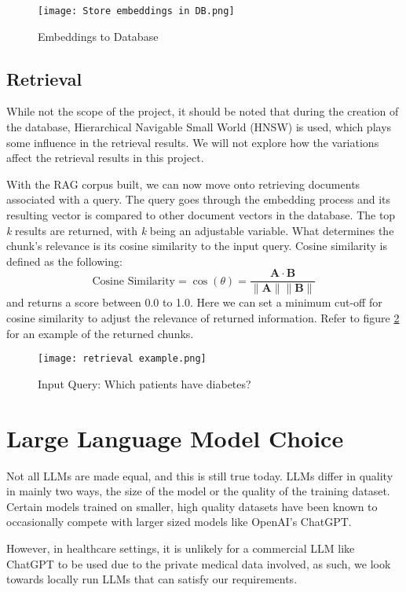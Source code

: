 \begin{figure}
	\texttt{[image: Store embeddings in DB.png]}
	\caption{Embeddings to Database}
	\centering
	\label{fig:EmbeddingsDatabase}
\end{figure}

\subsection{Retrieval}
While not the scope of the project, it should be noted that during the creation of the database, Hierarchical Navigable Small World (HNSW) is used, which plays some influence in the retrieval results. We will not explore how the variations affect the retrieval results in this project.

With the RAG corpus built, we can now move onto retrieving documents associated with a query.
The query goes through the embedding process and its resulting vector is compared to other document vectors in the database.
The top \textit{k} results are returned, with \textit{k} being an adjustable variable.
What determines the chunk's relevance is its cosine similarity to the input query.
Cosine similarity is defined as the following:
\[
	\text{Cosine Similarity} = \cos(\theta) = \frac{\mathbf{A} \cdot \mathbf{B}}{\|\mathbf{A}\| \|\mathbf{B}\|}
\]
and returns a score between 0.0 to 1.0.
Here we can set a minimum cut-off for cosine similarity to adjust the relevance of returned information.
Refer to figure \ref{fig:RetrievalExample} for an example of the returned chunks.

\begin{figure}
	\centering
	\texttt{[image: retrieval example.png]}
	\caption{Input Query: Which patients have diabetes?}
	\label{fig:RetrievalExample}
\end{figure}

\section{Large Language Model Choice}

Not all LLMs are made equal, and this is still true today. LLMs differ in quality in mainly two ways, the size of the model or the quality of the training dataset. Certain models trained on smaller, high quality datasets have been known to occasionally compete with larger sized models like OpenAI's ChatGPT.

However, in healthcare settings, it is unlikely for a commercial LLM like ChatGPT to be used due to the private medical data involved, as such, we look towards locally run LLMs that can satisfy our requirements.

